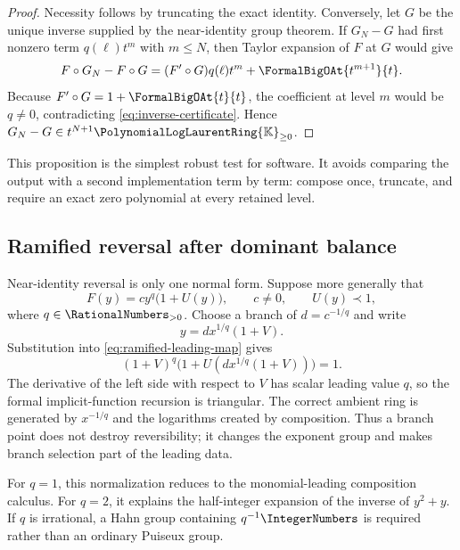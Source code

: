 \documentclass[11pt,oneside]{article}
\numberwithin{equation}{section}
\theoremstyle{definition}
\newcommand{\K}{\mathbb{K}}
\newcommand{\PL}{\PolynomialLogLaurentRing{\K}}
\begin{document}
\begin{proof}
Necessity follows by truncating the exact identity.  Conversely, let \(G\) be
the unique inverse supplied by the near-identity group theorem.  If \(G_N-G\)
had first nonzero term \(q(\ell)t^m\) with \(m\le N\), then Taylor expansion of
\(F\) at \(G\) would give
\[
  F\circ G_N-F\circ G
  =(F'\circ G)q(\ell)t^m+\FormalBigOAt{t^{m+1}}{t}.
\]
Because \(F'\circ G=1+\FormalBigOAt{t}{t}\), the coefficient at level \(m\) would be
\(q\ne0\), contradicting \eqref{eq:inverse-certificate}.  Hence
\(G_N-G\in t^{N+1}{\PL}_{\ge0}\).
\end{proof}

This proposition is the simplest robust test for software.  It avoids comparing
the output with a second implementation term by term: compose once, truncate,
and require an exact zero polynomial at every retained level.

\subsection{Ramified reversal after dominant balance}

Near-identity reversal is only one normal form.  Suppose more generally that
\begin{equation}\label{eq:ramified-leading-map}
  F(y)=c y^q\bigl(1+U(y)\bigr),
  \qquad c\ne0,
  \qquad U(y)\prec1,
\end{equation}
where \(q\in\RationalNumbers_{>0}\).  Choose a branch of
\(d=c^{-1/q}\) and write
\begin{equation}\label{eq:ramified-inverse-ansatz}
  y=d x^{1/q}(1+V).
\end{equation}
Substitution into \eqref{eq:ramified-leading-map} gives
\begin{equation}\label{eq:ramified-normalized-equation}
  (1+V)^q
  \bigl(1+U(d x^{1/q}(1+V))\bigr)=1.
\end{equation}
The derivative of the left side with respect to \(V\) has scalar leading value
\(q\), so the formal implicit-function recursion is triangular.  The correct
ambient ring is generated by \(x^{-1/q}\) and the logarithms created by
composition.  Thus a branch point does not destroy reversibility; it changes
the exponent group and makes branch selection part of the leading data.

For \(q=1\), this normalization reduces to the monomial-leading composition
calculus.  For \(q=2\), it explains the half-integer expansion of the inverse of
\(y^2+y\).  If \(q\) is irrational, a Hahn group containing \(q^{-1}\IntegerNumbers\) is
required rather than an ordinary Puiseux group.
\end{document}

